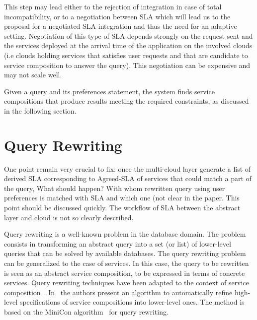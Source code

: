 This step may lead either to the rejection of integration in case of total incompatibility, or to a negotiation between SLA which will lead us to the proposal for a negotiated SLA integration and thus the need for an adaptive setting.
Negotiation of this type of SLA depends strongly on the request sent and the services deployed at the arrival time of the application on the involved  clouds (i.e clouds holding services that satisfies user requests and that are candidate to service composition to answer the query). This negotiation can be expensive and may not scale well.
 
Given a query and its preferences statement, the system  finds  service compositions that produce results   meeting the required constraints, as discussed in the following section.

 
 
\section{Query Rewriting}
\label{sec:queryRew}

\color{red}
One point remain very crucial to fix: once the multi-cloud layer generate a list of derived SLA corresponding to Agreed-SLA of services that could match a part of the query, What should happen?  With whom rewritten query using user preferences is matched with SLA and which one (not clear in the paper.  This point should be discussed quickly. The workflow of SLA between the abstract layer and cloud is not so clearly described.

\color{black}
Query rewriting is a well-known problem in the database domain.
The problem consists in transforming an abstract query into a set (or list) of lower-level queries that can be solved by  available databases.
The query rewriting problem can be generalized to the case of services.
In this case, the query to be rewritten is seen as an abstract service composition, to be expressed in terms of concrete services.
Query rewriting techniques have been adapted to the context of service composition~\cite{BBM10,ZLC11,CostaAMR13}. 
In~\cite{CostaAMR13} the authors present an algorithm to automatically refine high-level specifications of service compositions into lower-level ones. 
The method is based on the MiniCon algorithm~\cite{PH01} for query rewriting.

